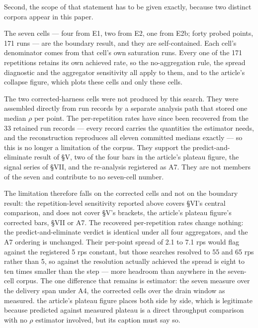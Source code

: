 \documentclass{ieeeaccess}
\begin{document}
Second, the scope of that statement has to be given exactly, because two distinct corpora appear in this paper.

The seven cells --- four from E1, two from E2, one from E2b; forty probed points, 171 runs --- are the boundary result, and they are self-contained. Each cell's denominator comes from that cell's own saturation runs. Every one of the 171 repetitions retains its own achieved rate, so the no-aggregation rule, the spread diagnostic and the aggregator sensitivity all apply to them, and to the article's collapse figure, which plots these cells and only these cells.

The two corrected-harness cells were not produced by this search. They were assembled directly from run records by a separate analysis path that stored one median $\rho$ per point. The per-repetition rates have since been recovered from the 33 retained run records --- every record carries the quantities the estimator needs, and the reconstruction reproduces all eleven committed medians exactly --- so this is no longer a limitation of the corpus. They support the predict-and-eliminate result of \S{}V, two of the four bars in the article's plateau figure, the signal series of \S{}VII, and the re-analysis registered as A7. They are not members of the seven and contribute to no seven-cell number.

The limitation therefore falls on the corrected cells and not on the boundary result: the repetition-level sensitivity reported above covers \S{}VI's central comparison, and does not cover \S{}V's brackets, the article's plateau figure's corrected bars, \S{}VII or A7. The recovered per-repetition rates change nothing: the predict-and-eliminate verdict is identical under all four aggregators, and the A7 ordering is unchanged. Their per-point spread of 2.1 to 7.1 rps would flag against the registered 5 rps constant, but those searches resolved to 55 and 65 rps rather than 5, so against the resolution actually achieved the spread is eight to ten times smaller than the step --- more headroom than anywhere in the seven-cell corpus. The one difference that remains is estimator: the seven measure over the delivery span under A4, the corrected cells over the drain window as measured. the article's plateau figure places both side by side, which is legitimate because predicted against measured plateau is a direct throughput comparison with no $\rho$ estimator involved, but its caption must say so.
\end{document}
